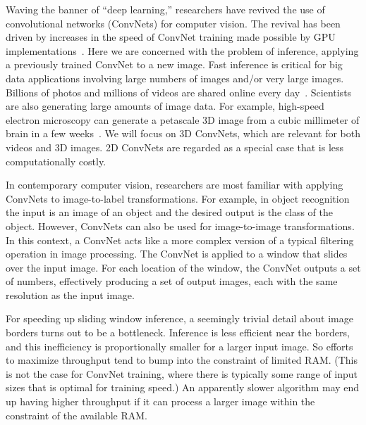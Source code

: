 \documentclass[conference]{./IEEEtran/IEEEtran}
\begin{document}
  Waving the banner of ``deep learning,'' researchers have revived the
  use of convolutional networks (ConvNets) for computer vision.  The
  revival has been driven by increases in the speed of ConvNet
  training made possible by GPU
  implementations~\cite{chellapilla2006high, scherer2010accelerating,
  strigl2010performance, ciresan2011flexible}. Here we are concerned
  with the problem of inference, applying a previously trained ConvNet
  to a new image.  Fast inference is critical for big data
  applications involving large numbers of images and/or very large
  images. Billions of photos and millions of videos are shared online
  every day~\cite{MeekerReport14, ReelSEO}.  Scientists are also
  generating large amounts of image data.  For example, high-speed
  electron microscopy can generate a petascale 3D image from a cubic
  millimeter of brain in a few weeks~\cite{Lichtman2014big}.  We will
  focus on 3D ConvNets, which are relevant for both videos and 3D
  images.  2D ConvNets are regarded as a special case that is less
  computationally costly.

  In contemporary computer vision, researchers are most familiar with
  applying ConvNets to image-to-label transformations.  For example,
  in object recognition the input is an image of an object and the
  desired output is the class of the object.  However, ConvNets can
  also be used for image-to-image transformations.  In this context, a
  ConvNet acts like a more complex version of a typical filtering
  operation in image processing.  The ConvNet is applied to a window
  that slides over the input image.  For each location of the window,
  the ConvNet outputs a set of numbers, effectively producing a set of
  output images, each with the same resolution as the input image.

  For speeding up sliding window inference, a seemingly trivial detail
  about image borders turns out to be a bottleneck.  Inference is less
  efficient near the borders, and this inefficiency is proportionally
  smaller for a larger input image.  So efforts to maximize
  throughput tend to bump into the constraint of limited RAM.  (This
  is not the case for ConvNet training, where there is typically some
  range of input sizes that is optimal for training speed.)
  An apparently slower algorithm may end up having higher
  throughput if it can process a larger image within the constraint of
  the available RAM.
\end{document}
